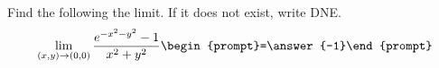 \documentclass{ximera}
\author{David Guichard \and Neal Koblitz \and H. Jerome Keisler \and Albert Scheller \and Barry Balof \and Mike Wills \and Matthew Carr}
\begin{document}
\begin{exercise}




Find the following the limit. If it does not exist, write DNE. 
\[
\lim_{(x,y)\to (0,0)}\frac{e^{-x^2-y^2}-1}{x^2+y^2}\begin{prompt}=\answer{-1}\end{prompt}
\]

\end{exercise}
\end{document}
